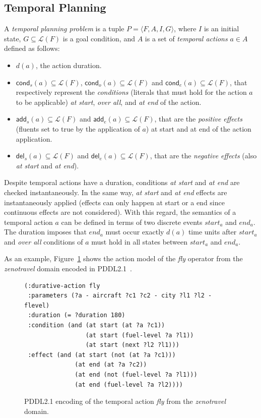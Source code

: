 \documentclass[letterpaper]{article} %
\newcommand{\tup}[1]{{\langle #1 \rangle}}
\newcommand{\del}{\mathsf{del}}     %
\newcommand{\add}{\mathsf{add}}     %
\newcommand{\cond}{\mathsf{cond}}   %
\begin{document}
\subsection{Temporal Planning}
A {\em temporal planning problem} is a tuple $P=\tup{F,A,I,G}$, where $I$ is an initial state, $G\subseteq\mathcal{L}(F)$ is a goal condition, and $A$ is a set of {\em temporal actions} $a\in A$ defined as follows:
\begin{itemize}
\item $d(a)$, the action duration.
\item $\cond_s(a)\subseteq\mathcal{L}(F)$, $\cond_o(a)\subseteq\mathcal{L}(F)$ and $\cond_e(a)\subseteq\mathcal{L}(F)$, that respectively represent the {\em conditions} (literals that must hold for the action $a$ to be applicable) {\em at start}, {\em over all}, and {\em at end} of the action.

\item $\add_s(a)\subseteq\mathcal{L}(F)$ and $\add_e(a)\subseteq\mathcal{L}(F)$, that are the {\em positive effects} (fluents set to true by the application of $a$) at start and at end of the action application.
\item  $\del_s(a)\subseteq\mathcal{L}(F)$ and $\del_e(a)\subseteq\mathcal{L}(F)$, that are the {\em negative effects} (also {\em at start} and {\em at end}).
\end{itemize}
Despite temporal actions have a duration, conditions {\em at start} and {\em at end} are checked instantaneously. In the same way, {\em at start} and {\em at end} effects are instantaneously applied (effects can only happen at start or a end since continuous effects are not considered). With this regard, the semantics of a temporal action $a$ can be defined in terms of two discrete events $start_a$ and $end_a$. The duration imposes that $end_a$ must occur exactly $d(a)$ time units after $start_a$ and {\em over all} conditions of $a$ must hold in all states between $start_a$ and $end_a$. 

As an example, Figure~\ref{fig:flyt} shows the action model of the {\em fly} operator from the {\em zenotravel} domain encoded in PDDL2.1~\cite{fox2003pddl2}.

\begin{figure}[hbt!]
	\begin{scriptsize}
		\begin{verbatim}
(:durative-action fly 
 :parameters (?a - aircraft ?c1 ?c2 - city ?l1 ?l2 - flevel)
 :duration (= ?duration 180)
 :condition (and (at start (at ?a ?c1))
                 (at start (fuel-level ?a ?l1))
                 (at start (next ?l2 ?l1)))
 :effect (and (at start (not (at ?a ?c1)))
              (at end (at ?a ?c2))
              (at end (not (fuel-level ?a ?l1)))
              (at end (fuel-level ?a ?l2)))) 
		\end{verbatim}
	\end{scriptsize}
	\caption{PDDL2.1 encoding of the temporal action {\em fly} from the {\em zenotravel} domain.}
	\label{fig:flyt}
\end{figure}
\end{document}

